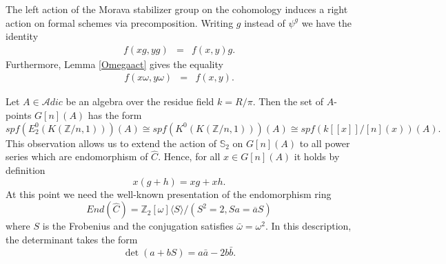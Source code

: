 \documentclass{amsart}
\renewcommand{\S}{{\mathbb S}}
\newcommand {\Z}{{\mathbb Z}}
\newcommand{\cat}{\mathcal}    %
\numberwithin{equation}{section}
\theoremstyle{definition}  %
\newtheorem{set theory}[thm]{Set Theoretic Prelude}
\begin{document}
The left action of the Morava stabilizer group on the cohomology induces a right action on formal schemes via precomposition. Writing $g$ instead of $\psi^g$  we have the identity
\begin{eqnarray}
\label{ringop}
 f(xg,yg)&=&f(x,y)g.
 \end{eqnarray}
Furthermore, Lemma \ref{Omegaact} gives the equality
\begin{eqnarray}\label{trivial}
 f(x {\omega},y {\omega})&=&f(x,y).
 \end{eqnarray}

Let $A\in {\cat A}dic$ be an algebra over the residue field $k=R/\pi$. 
Then the set of $A$-points $G[n](A)$ has the form 
$$spf(E_2^0(K(\Z/n ,1)))(A)\cong spf(K^0(K(\Z/n ,1)))(A)\cong 
spf(k[\![x]\! ]/[n](x))(A).
$$ 
This observation allows us to extend the action of $\S_2$ on $G[n](A)$ to all power series which are endomorphism of $\hat{C}$. Hence, for all $x\in G[n](A)$  it holds by definition
$$ x ({g+h})=xg +xh.$$
At this point we need the well-known presentation of the endomorphism ring
$$End(\hat{C})=\Z_2[\omega]\langle S\rangle /(S^2=2,Sa=\overline{a}S)$$
where $S$ is the Frobenius and the conjugation satisfies $\bar{\omega}=\omega^2$. In this description, the determinant  takes the form
$$ \det (a+bS)=a\bar{a}-2b\bar{b}.$$
\end{document}
